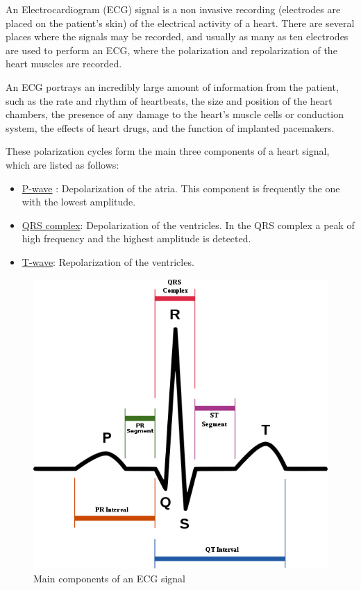 \documentclass[conference]{IEEEtran}
\begin{document}
An Electrocardiogram (ECG) signal is a non invasive recording (electrodes are placed on the patient's skin) of the electrical activity of a heart. There are several places where the signals may be recorded, and usually as many as ten electrodes are used to perform an ECG, where the polarization and repolarization of the heart muscles are recorded. \par
An ECG portrays an incredibly large amount of information from the patient, such as the rate and rhythm of heartbeats, the size and position of the heart chambers, the presence of any damage to the heart's muscle cells or conduction system, the effects of heart drugs, and the function of implanted pacemakers.\par
These polarization cycles form the main three components of a heart signal, which are listed as follows:
\begin{itemize}
\item \underline{P-wave} : Depolarization of the atria. This component is frequently the one with the lowest amplitude.
\item \underline{QRS complex}: Depolarization of the ventricles. In the QRS complex a peak of high frequency and the highest amplitude is detected. 
\item \underline{T-wave}: Repolarization of the ventricles.
\end{itemize} 

\begin{figure}[H]
\centerline{\includegraphics[scale=0.3]{SinusRhythmLabels}}
\caption{Main components of an ECG signal}
\label{fig}
\end{figure}
\end{document}
